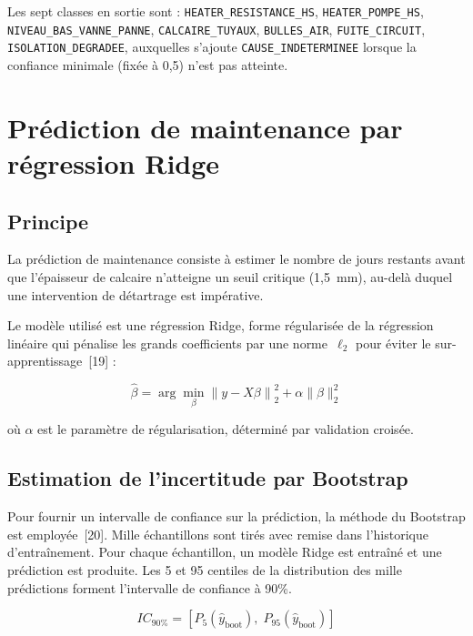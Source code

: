 Les sept classes en sortie sont : \texttt{HEATER\_RESISTANCE\_HS}, \texttt{HEATER\_POMPE\_HS}, \texttt{NIVEAU\_BAS\_VANNE\_PANNE}, \texttt{CALCAIRE\_TUYAUX}, \texttt{BULLES\_AIR}, \texttt{FUITE\_CIRCUIT}, \texttt{ISOLATION\_DEGRADEE}, auxquelles s'ajoute \texttt{CAUSE\_INDETERMINEE} lorsque la confiance minimale (fixée à 0,5) n'est pas atteinte.

\section{Prédiction de maintenance par régression Ridge}

\subsection{Principe}

La prédiction de maintenance consiste à estimer le nombre de jours restants avant que l'épaisseur de calcaire n'atteigne un seuil critique (1,5~mm), au-delà duquel une intervention de détartrage est impérative.

Le modèle utilisé est une régression Ridge, forme régularisée de la régression linéaire qui pénalise les grands coefficients par une norme~\(\ell_2\) pour éviter le sur-apprentissage~[19] :

\begin{equation}
\hat{\beta} = \arg\min_{\beta} \left\| y - X\beta \right\|_2^2 + \alpha \|\beta\|_2^2
\label{eq:ridge}
\end{equation}

où \(\alpha\) est le paramètre de régularisation, déterminé par validation croisée.

\subsection{Estimation de l'incertitude par Bootstrap}

Pour fournir un intervalle de confiance sur la prédiction, la méthode du Bootstrap est employée~[20]. Mille échantillons sont tirés avec remise dans l'historique d'entraînement. Pour chaque échantillon, un modèle Ridge est entraîné et une prédiction est produite. Les 5 et 95 centiles de la distribution des mille prédictions forment l'intervalle de confiance à 90\%.

\begin{equation}
IC_{90\%} = \left[ P_5(\hat{y}_{\text{boot}}),\; P_{95}(\hat{y}_{\text{boot}}) \right]
\label{eq:bootstrap}
\end{equation}

